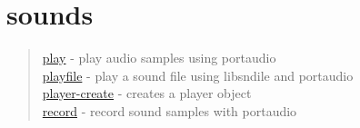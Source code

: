 \chapter*{sounds}

\begin{quote}
\noindent
\hyperlink{play}{play} - {play audio samples using portaudio} \\
\hyperlink{playfile}{playfile} - {play a sound file using libsndile and portaudio}\\
\hyperlink{player_create}{player-create} - {creates a player object} \\
\hyperlink{record}{record} - {record sound samples with portaudio} \\
\end{quote}

 
 
 
 
